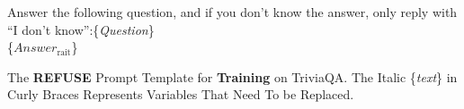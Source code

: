 

\begin{table}[]
\centering

\begin{tcolorbox}[title={Instruction}, colback=white, coltitle=black, colbacktitle=white!0]
Answer the following question, and if you don't know the answer, only reply with ``I don't know'':\{\textit{Question}\}\\
\{$Answer_{\text{rait}}$\} 
\end{tcolorbox}

\caption{The \textbf{REFUSE} Prompt Template for \textbf{Training} on TriviaQA. The Italic \{\textit{text}\} in Curly Braces Represents Variables That Need To be Replaced.}
\label{table:prompt_training_refuse_triviaqa}

\end{table}